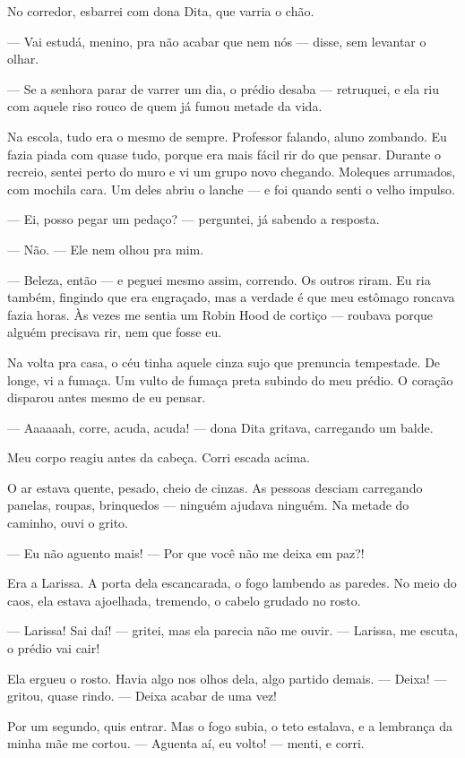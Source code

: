 No corredor, esbarrei com dona Dita, que varria o chão.

— Vai estudá, menino, pra não acabar que nem nós — disse, sem levantar o olhar.

— Se a senhora parar de varrer um dia, o prédio desaba — retruquei, e ela riu com aquele riso rouco de quem já fumou metade da vida.

Na escola, tudo era o mesmo de sempre. Professor falando, aluno zombando. Eu fazia piada com quase tudo, porque era mais fácil rir do que pensar.  
Durante o recreio, sentei perto do muro e vi um grupo novo chegando. Moleques arrumados, com mochila cara. Um deles abriu o lanche — e foi quando senti o velho impulso.

— Ei, posso pegar um pedaço? — perguntei, já sabendo a resposta.

— Não. — Ele nem olhou pra mim.

— Beleza, então — e peguei mesmo assim, correndo.  
Os outros riram. Eu ria também, fingindo que era engraçado, mas a verdade é que meu estômago roncava fazia horas. Às vezes me sentia um Robin Hood de cortiço — roubava porque alguém precisava rir, nem que fosse eu.

\medskip

Na volta pra casa, o céu tinha aquele cinza sujo que prenuncia tempestade.  
De longe, vi a fumaça.  
Um vulto de fumaça preta subindo do meu prédio.  
O coração disparou antes mesmo de eu pensar.

— Aaaaaah, corre, acuda, acuda! — dona Dita gritava, carregando um balde.

Meu corpo reagiu antes da cabeça.  
Corri escada acima.

O ar estava quente, pesado, cheio de cinzas. As pessoas desciam carregando panelas, roupas, brinquedos — ninguém ajudava ninguém.  
Na metade do caminho, ouvi o grito.

— Eu não aguento mais!  
— Por que você não me deixa em paz?!

Era a Larissa.  
A porta dela escancarada, o fogo lambendo as paredes.  
No meio do caos, ela estava ajoelhada, tremendo, o cabelo grudado no rosto.

— Larissa! Sai daí! — gritei, mas ela parecia não me ouvir. — Larissa, me escuta, o prédio vai cair!

Ela ergueu o rosto. Havia algo nos olhos dela, algo partido demais.  
— Deixa! — gritou, quase rindo. — Deixa acabar de uma vez!

Por um segundo, quis entrar.  
Mas o fogo subia, o teto estalava, e a lembrança da minha mãe me cortou.  
— Aguenta aí, eu volto! — menti, e corri.

